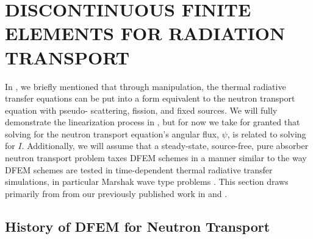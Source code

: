 %
%
%


\chapter{\uppercase {Discontinuous Finite Elements for Radiation Transport}}
\label{sec:chapter2_constant_xs}

In , we briefly mentioned that through manipulation, the thermal radiative transfer equations can be put into a form equivalent to the 
neutron transport equation with pseudo- scattering, fission, and fixed sources.  
We will fully demonstrate the linearization process in , but for now we 
take for granted that solving for the neutron transport equation's angular flux, $\psi$, is related to solving  for $I$.
Additionally, we will assume that a steady-state, source-free, pure absorber neutron transport problem taxes DFEM schemes in a manner similar to the way DFEM schemes are tested
in time-dependent thermal radiative transfer simulations, in particular Marshak wave type problems \cite{ober_shadid}.  This section draws primarily from
from our previously published work in \cite{mc_2013} and \cite{part_1_paper}.

\section{History of DFEM for Neutron Transport}

